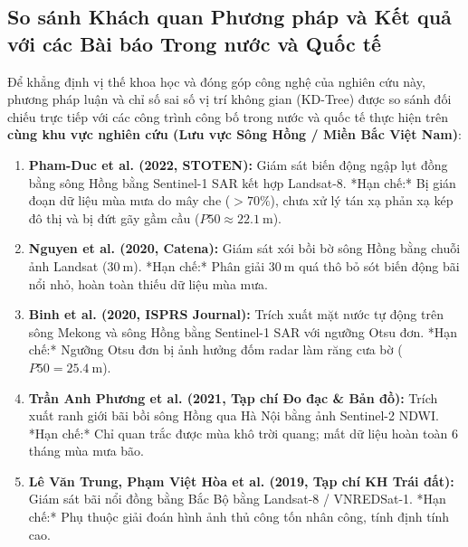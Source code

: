 \documentclass[11pt,a4paper]{article}
\begin{document}
\subsection{So sánh Khách quan Phương pháp và Kết quả với các Bài báo Trong nước và Quốc tế}
Để khẳng định vị thế khoa học và đóng góp công nghệ của nghiên cứu này, phương pháp luận và chỉ số sai số vị trí không gian (KD-Tree) được so sánh đối chiếu trực tiếp với các công trình công bố trong nước và quốc tế thực hiện trên \textbf{cùng khu vực nghiên cứu (Lưu vực Sông Hồng / Miền Bắc Việt Nam)}:

\begin{enumerate}
    \item \textbf{Pham-Duc et al. (2022, STOTEN):} Giám sát biến động ngập lụt đồng bằng sông Hồng bằng Sentinel-1 SAR kết hợp Landsat-8. *Hạn chế:* Bị gián đoạn dữ liệu mùa mưa do mây che ($>70\%$), chưa xử lý tán xạ phản xạ kép đô thị và bị đứt gãy gầm cầu ($P50 \approx 22.1~\text{m}$).
    \item \textbf{Nguyen et al. (2020, Catena):} Giám sát xói bồi bờ sông Hồng bằng chuỗi ảnh Landsat ($30~\text{m}$). *Hạn chế:* Phân giải $30~\text{m}$ quá thô bỏ sót biến động bãi nổi nhỏ, hoàn toàn thiếu dữ liệu mùa mưa.
    \item \textbf{Binh et al. (2020, ISPRS Journal):} Trích xuất mặt nước tự động trên sông Mekong và sông Hồng bằng Sentinel-1 SAR với ngưỡng Otsu đơn. *Hạn chế:* Ngưỡng Otsu đơn bị ảnh hưởng đốm radar làm răng cưa bờ ($P50 = 25.4~\text{m}$).
    \item \textbf{Trần Anh Phương et al. (2021, Tạp chí Đo đạc \& Bản đồ):} Trích xuất ranh giới bãi bồi sông Hồng qua Hà Nội bằng ảnh Sentinel-2 NDWI. *Hạn chế:* Chỉ quan trắc được mùa khô trời quang; mất dữ liệu hoàn toàn 6 tháng mùa mưa bão.
    \item \textbf{Lê Văn Trung, Phạm Việt Hòa et al. (2019, Tạp chí KH Trái đất):} Giám sát bãi nổi đồng bằng Bắc Bộ bằng Landsat-8 / VNREDSat-1. *Hạn chế:* Phụ thuộc giải đoán hình ảnh thủ công tốn nhân công, tính định tính cao.
\end{enumerate}
\end{document}
